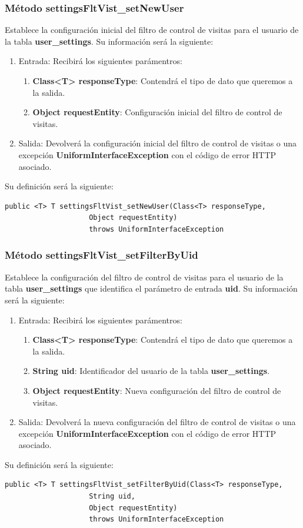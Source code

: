 \subsubsection{Método settingsFltVist\_setNewUser}
Establece la configuración inicial del filtro de control de visitas para el usuario de la tabla \textbf{user\_settings}. Su información será la siguiente:
\begin{enumerate}
\item Entrada: Recibirá los siguientes parámentros:
\begin{enumerate}
\item \textbf{Class<T> responseType}: Contendrá el tipo de dato que queremos a la salida. 
\item \textbf{Object requestEntity}: Configuración inicial del filtro de control de visitas.
\end{enumerate}
\item Salida: Devolverá la configuración inicial del filtro de control de visitas o una excepción \textbf{UniformInterfaceException} con el código de error HTTP asociado.
\end{enumerate}
\bigskip
\par
Su definición será la siguiente:
\begin{verbatim}public <T> T settingsFltVist_setNewUser(Class<T> responseType, 
					Object requestEntity) 
					throws UniformInterfaceException\end{verbatim}


\subsubsection{Método settingsFltVist\_setFilterByUid}
Establece la configuración del filtro de control de visitas para el usuario de la tabla \textbf{user\_settings} que identifica el parámetro de entrada \textbf{uid}. Su información será la siguiente:
\begin{enumerate}
\item Entrada: Recibirá los siguientes parámentros:
\begin{enumerate}
\item \textbf{Class<T> responseType}: Contendrá el tipo de dato que queremos a la salida. 
\item \textbf{String uid}: Identificador del usuario de la tabla \textbf{user\_settings}.
\item \textbf{Object requestEntity}: Nueva configuración del filtro de control de visitas.
\end{enumerate}
\item Salida: Devolverá la nueva configuración del filtro de control de visitas o una excepción \textbf{UniformInterfaceException} con el código de error HTTP asociado.
\end{enumerate}
\bigskip
\par
Su definición será la siguiente:
\begin{verbatim}public <T> T settingsFltVist_setFilterByUid(Class<T> responseType, 
					String uid, 
					Object requestEntity) 
					throws UniformInterfaceException\end{verbatim}

